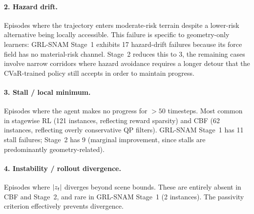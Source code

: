 \paragraph{2. Hazard drift.}
Episodes where the trajectory enters moderate-risk terrain despite a
lower-risk alternative being locally accessible.
This failure is specific to geometry-only learners: GRL-SNAM Stage~1
exhibits 17 hazard-drift failures because its force field has no
material-risk channel.
Stage~2 reduces this to 3, the remaining cases involve narrow corridors
where hazard avoidance requires a longer detour that the CVaR-trained
policy still accepts in order to maintain progress.

\paragraph{3. Stall / local minimum.}
Episodes where the agent makes no progress for $>50$ timesteps.
Most common in stagewise RL (121 instances, reflecting reward sparsity)
and CBF (62 instances, reflecting overly conservative QP filters).
GRL-SNAM Stage~1 has 11 stall failures; Stage~2 has 9 (marginal
improvement, since stalls are predominantly geometry-related).

\paragraph{4. Instability / rollout divergence.}
Episodes where $|z_t|$ diverges beyond scene bounds.
These are entirely absent in CBF and Stage~2, and rare in GRL-SNAM
Stage~1 (2 instances).
The passivity criterion effectively prevents divergence.




